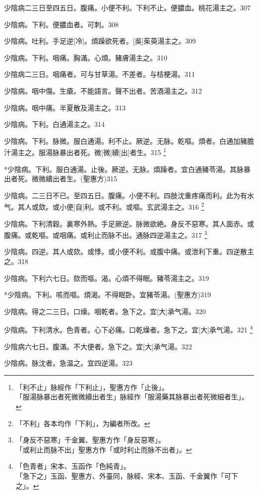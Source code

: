 \documentclass[12pt,oneside,UTF8,b5paper]{ctexbook}她她她她她她她
\begin{document}
少陰病二三日至四五日。腹痛。小便不利。下利不止。便膿血。桃花湯主之。307

少陰病。下利。便膿血者。可刺。308

少陰病。吐利。手足逆[冷]。煩躁欲死者。[吳]茱萸湯主之。309

少陰病。下利。咽痛。胸滿。心煩。豬膚湯主之。310

少陰病二三日。咽痛者。可与甘草湯。不差者。与桔梗湯。311

少陰病。咽中傷。生瘡。不能語言。聲不出者。苦酒湯主之。312

少陰病。咽中痛。半夏散及湯主之。313

少陰病。下利。白通湯主之。314

少陰病。下利。脉微。服白通湯。利不止。厥逆。无脉。乾嘔。煩者。白通加豬膽汁湯主之。服湯脉暴出者死。微[微]續[出]者生。315
	\footnote{「利不止」脉經作「下利止」，聖惠方作「止後」。\\「服湯脉暴出者死微微續出者生」脉經作「服湯藥其脉暴出者死微細者生」。}

*少陰病。下利。服白通湯。止後。厥逆。无脉。煩躁者。宜白通豬苓湯。其脉暴出者死。微微續出者生。(聖惠方)315

少陰病。二三日不已。至四五日。腹痛。小便不利。四肢沈重疼痛而利。此为有水气。其人或欬。或小便[自]利。或不利。或嘔。玄武湯主之。316
	\footnote{「不利」各本均作「下利」，为編者所改。}

少陰病。下利清穀。裏寒外熱。手足厥逆。脉微欲絶。身反不惡寒。其人面赤。或腹痛。或乾嘔。或咽痛。或利止而脉不出。通脉四逆湯主之。317
	\footnote{「身反不惡寒」千金翼、聖惠方作「身反惡寒」。\\「或利止而脉不出」聖惠方作「或时利止而脉不出者」。}

少陰病。四逆。其人或欬。或悸。或小便不利。或腹中痛。或泄利下重。四逆散主之。318

少陰病。下利六七日。欬而嘔。渴。心煩不得眠。豬苓湯主之。319

*少陰病。下利。咳而嘔。煩渴。不得眠卧。宜豬苓湯。(聖惠方)319

少陰病。得之二三日。口燥。咽乾者。急下之。宜[大]承气湯。320

少陰病。下利清水。色青者。心下必痛。口乾燥者。急下之。宜[大]承气湯。321
	\footnote{「色青者」宋本、玉函作「色純青」。\\「急下之」玉函、聖惠方、外臺同，脉經、宋本、玉函、千金翼作「可下之」。}

少陰病六七日。腹滿。不大便者。急下之。宜[大]承气湯。322

少陰病。脉沈者。急温之。宜四逆湯。323
\end{document}
